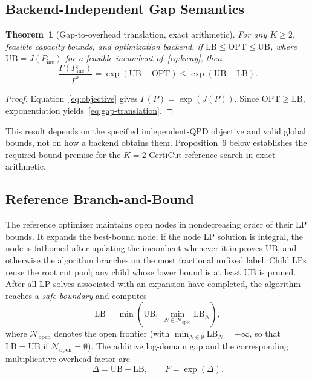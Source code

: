 \documentclass[11pt]{article}
\newcommand{\CertiCut}{CertiCut}
\newcommand{\CertiCut}{\textsc{CertiCut}}
\newcommand{\OPT}{\mathrm{OPT}}
\newcommand{\LB}{\mathrm{LB}}
\newcommand{\UB}{\mathrm{UB}}
\newcommand{\gap}{\Delta}
\begin{document}
\subsection{Backend-Independent Gap Semantics}

\textbf{Theorem~1} (Gap-to-overhead translation, exact arithmetic). \textit{For any $K\geq2$, feasible capacity bounds, and optimization backend, if $\LB\leq\OPT\leq\UB$, where $\UB=J(P_{\mathrm{inc}})$ for a feasible incumbent of~\eqref{eq:kway}, then}
\begin{equation}
  \frac{\Gamma(P_{\mathrm{inc}})}{\Gamma^*}
  = \exp(\UB-\OPT) \leq \exp(\UB-\LB).
  \label{eq:gap-translation}
\end{equation}

\begin{proof} Equation~\eqref{eq:objective} gives $\Gamma(P)=\exp(J(P))$. Since $\OPT\geq\LB$, exponentiation yields~\eqref{eq:gap-translation}.\end{proof}

This result depends on the specified independent-QPD objective and valid global bounds, not on how a backend obtains them. Proposition~6 below establishes the required bound premise for the $K=2$ \CertiCut{} reference search in exact arithmetic.

\subsection{Reference Branch-and-Bound}

The reference optimizer maintains open nodes in nondecreasing order of their LP bounds. It expands the best-bound node; if the node LP solution is integral, the node is fathomed after updating the incumbent whenever it improves $\UB$, and otherwise the algorithm branches on the most fractional unfixed label. Child LPs reuse the root cut pool; any child whose lower bound is at least $\UB$ is pruned. After all LP solves associated with an expansion have completed, the algorithm reaches a \emph{safe boundary} and computes
\begin{equation}
  \LB = \min\!\left(\UB,\; \min_{N \in \mathcal{N}_{\mathrm{open}}} \LB_N\right),
  \label{eq:global-lb}
\end{equation}
where $\mathcal{N}_{\mathrm{open}}$ denotes the open frontier (with $\min_{N \in \emptyset} \LB_N = +\infty$, so that $\LB = \UB$ if $\mathcal{N}_{\mathrm{open}} = \emptyset$). The additive log-domain gap and the corresponding multiplicative overhead factor are
\begin{equation}
  \gap = \UB - \LB, \qquad F = \exp(\gap).
  \label{eq:factor}
\end{equation}
\end{document}
